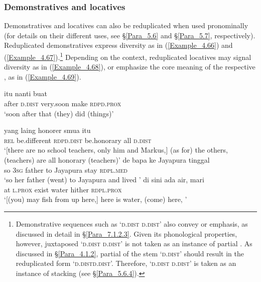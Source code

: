 {\subsubsection[Demonstratives and locatives]{Demonstratives and locatives}
\label{Para_4.2.5.2}
Demonstratives and locatives can also be reduplicated when used pronominally (for details on their different uses, see §\ref{Para_5.6} and §\ref{Para_5.7}, respectively). Reduplicated demonstratives express diversity as in (\ref{Example_4.66}) and (\ref{Example_4.67}).\footnote{Demonstrative sequences such as  ‘\textsc{d.dist} \textsc{d.dist}’ also convey  or emphasis, as discussed in detail in §\ref{Para_7.1.2.3}. Given its phonological properties, however, juxtaposed  ‘\textsc{d.dist} \textsc{d.dist}’ is not taken as an instance of partial . As discussed in §\ref{Para_4.1.2}, partial  of the stem  ‘\textsc{d.dist}’ should result in the reduplicated form  ‘\textsc{d.dist}{\Tilde}\textsc{d.dist}’. Therefore,  ‘\textsc{d.dist} \textsc{d.dist}’ is taken as an instance of  stacking (see §\ref{Para_5.6.4}).} Depending on the context, reduplicated locatives may signal diversity as in (\ref{Example_4.68}), or emphasize the core meaning of the respective , as in (\ref{Example_4.69}).


\ea
\label{Example_4.66}

 {itu} {nanti} {buat} {}\\ %
 after  \textsc{d.dist}  very.soon  make  \textsc{rdp}{\Tilde}\textsc{d.prox}\\
\glt 
‘soon after that (they) did  (things)’ \textstyleExampleSource{[080923-013-CvEx.0030]}
\z

\ea
\label{Example_4.67}
\gll {\ldots} {yang} {laing} {} {honorer} {smua} {itu}\\ %
 { }  \textsc{rel}  be.different  \textsc{rdp}{\Tilde}\textsc{d.dist}  be.honorary  all  \textsc{d.dist}\\
\glt 
‘[there are no school teachers, only him and Markus,] (as for) the others,  (teachers) are all honorary (teachers)’ \textstyleExampleSource{[081011-024-Cv.0054]}
\z
\ea
\label{Example_4.68}
 {de} {bapa} {ke} {Jayapura} {tinggal} {}\\ %
 so  \textsc{3sg}  father  to  Jayapura  stay  \textsc{rdp}{\Tilde}\textsc{l.med}\\
\glt 
‘so her father (went) to Jayapura and lived ’ \textstyleExampleSource{[081011-023-Cv.0163]}
\z
\ea
\label{Example_4.69}
\gll {\ldots} {di} {sini} {ada} {air}, {mari} {}\\ %
{ }   at  \textsc{l.prox}  exist  water  hither  \textsc{rdp}{\Tilde}\textsc{l.prox}\\
\glt
‘[(you) may fish from up here,] here is water, (come) here, ’ \textstyleExampleSource{[081025-003-Cv.0093]}
\z


}
